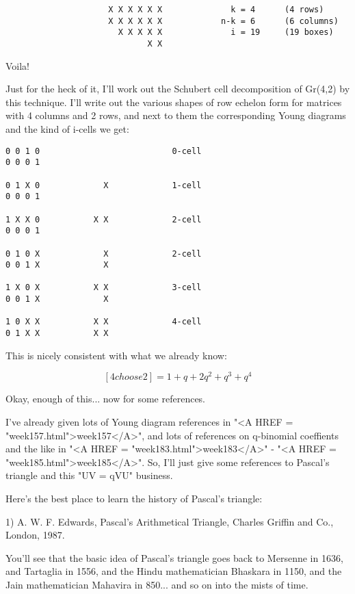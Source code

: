 \begin{verbatim}
                     X X X X X X              k = 4      (4 rows)
                     X X X X X X            n-k = 6      (6 columns)
                       X X X X X              i = 19     (19 boxes)
                             X X
\end{verbatim}
    
Voila!

Just for the heck of it, I'll work out the Schubert cell decomposition
of Gr(4,2) by this technique.   I'll write out the various shapes of 
row echelon form for matrices with 4 columns and 2 rows, and next to 
them the corresponding Young diagrams and the kind of i-cells we get:

\begin{verbatim}
0 0 1 0                           0-cell
0 0 0 1         
  
0 1 X 0             X             1-cell
0 0 0 1                 

1 X X 0           X X             2-cell
0 0 0 1     

0 1 0 X             X             2-cell
0 0 1 X             X

1 X 0 X           X X             3-cell
0 0 1 X             X

1 0 X X           X X             4-cell
0 1 X X           X X

\end{verbatim}
    
This is nicely consistent with what we already know:

$$
[4 choose 2] = 1 + q + 2q^{2} + q^{3} + q^{4}
$$
    
Okay, enough of this... now for some references.  

I've already given lots of Young diagram references in "<A HREF =
"week157.html">week157</A>", and lots of references on q-binomial
coeffients and the like in "<A HREF =
"week183.html">week183</A>" - "<A HREF =
"week185.html">week185</A>".  So, I'll just give some references to
Pascal's triangle and this "UV = qVU" business.

Here's the best place to learn the history of Pascal's triangle:

1) A. W. F. Edwards, Pascal's Arithmetical Triangle, Charles Griffin
and Co., London, 1987.

You'll see that the basic idea of Pascal's triangle goes back to
Mersenne in 1636, and Tartaglia in 1556, and the Hindu mathematician
Bhaskara in 1150, and the Jain mathematician Mahavira in 850... and
so on into the mists of time.  

